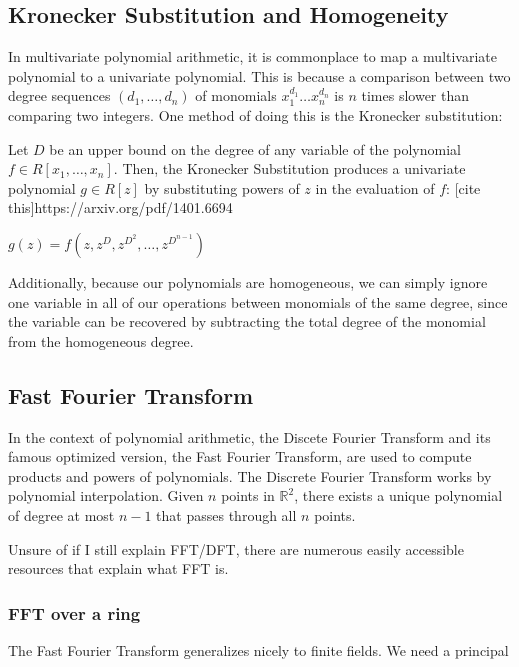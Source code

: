 \subsection{Kronecker Substitution and Homogeneity}
In multivariate polynomial arithmetic, it is commonplace to map a multivariate polynomial to a univariate 
polynomial. This is because a comparison between two degree sequences $(d_1, \dots , d_n)$ of monomials 
$x_1^{d_1} \dots x_n^{d_n}$ is $n$ times slower than comparing two integers. One method of doing this is the Kronecker 
substitution:

\begin{defn}
    Let $D$ be an upper bound on the degree of any variable of the polynomial $f \in R[x_1, \dots, x_n]$. 
    Then, the Kronecker Substitution produces a univariate polynomial $g \in R[z]$ by substituting powers of $z$ in 
    the evaluation of $f$: [cite this]{https://arxiv.org/pdf/1401.6694}

    \begin{center}
        $g(z) = f(z, z^D, z^{D^2}, \dots, z^{D^{n-1}})$
    \end{center}
\end{defn}

\noindent Additionally, because our polynomials are homogeneous, we can simply ignore one variable in all of our 
operations between monomials of the same degree, since the variable can be recovered by subtracting the 
total degree of the monomial from the homogeneous degree.

\subsection{Fast Fourier Transform}
In the context of polynomial arithmetic, the Discete Fourier Transform and its famous optimized version, 
the Fast Fourier Transform, are used to compute products and powers of polynomials. The Discrete Fourier 
Transform works by polynomial interpolation. Given $n$ points in $\mathbb{R}^2$, there exists a unique polynomial of degree at most $n - 1$ that passes through all $n$ points.

Unsure of if I still explain FFT/DFT, there are numerous easily accessible resources that explain what FFT is.

\subsubsection{FFT over a ring}
The Fast Fourier Transform generalizes nicely to finite fields. We need a principal 


